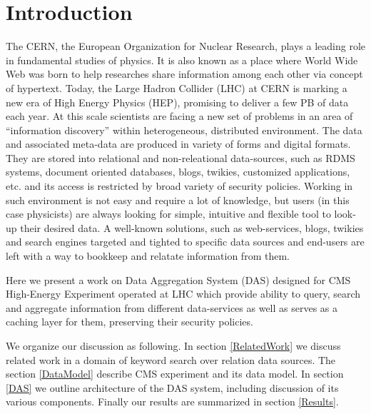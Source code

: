 \documentclass[a4paper]{jpconf}
\begin{document}
\newpage

\section{Introduction}
The CERN, the European Organization for Nuclear Research, plays a leading
role in fundamental studies of physics. It is also known as a place where
World Wide Web was born to help researches share information among each other
via concept of hypertext.
Today, the Large Hadron Collider (LHC) at CERN is marking a new era of High Energy
Physics (HEP), promising to deliver a few PB of data each year. 
At this scale scientists are facing a new set of problems in an area of
``information discovery'' within heterogeneous, distributed environment.
The data and associated meta-data are produced in variety of forms and digital formats.
They are stored into relational and non-releational data-sources, such as 
RDMS systems, document oriented databases, blogs, twikies, customized applications, etc. 
and its access is restricted by broad variety of security policies. 
Working in such environment is not easy and require a lot of knowledge, but users
(in this case physicists) are always looking for simple, intuitive and flexible
tool to look-up their desired data. A well-known solutions, such as web-services,
blogs, twikies and search engines targeted and tighted to specific data
sources and end-users are left with a way to bookkeep and relatate information
from them.

Here we present a work on Data Aggregation System (DAS) designed for
CMS High-Energy Experiment operated at LHC which provide
ability to query, search and aggregate information from different 
data-services as well as serves as a caching layer for them, 
preserving their security policies. 

We organize
our discussion as following. In section \ref{RelatedWork} we discuss
related work in a domain of keyword search over relation data sources.
The section \ref{DataModel} describe CMS experiment and its data model. In section
\ref{DAS} we outline architecture of the DAS system, including discussion of its
various components. Finally our results are summarized in section \ref{Results}.

\end{document}
